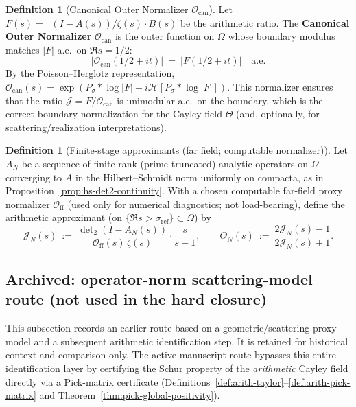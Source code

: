 \documentclass[11pt]{article}
\theoremstyle{definition}
\newtheorem{definition}[theorem]{Definition}
\theoremstyle{remark}
\theoremstyle{definition}
\DeclareMathOperator{\dettwo}{det_2}
\begin{document}
\begin{definition}[Canonical Outer Normalizer \(\mathcal O_{\mathrm{can}}\)]\label{def:canonical-normalizer}
Let $F(s) = \dettwo(I - A(s)) / \zeta(s) \cdot B(s)$ be the arithmetic ratio.
The \textbf{Canonical Outer Normalizer} \(\mathcal O_{\mathrm{can}}\) is the outer function on $\Omega$ whose boundary modulus matches $|F|$ a.e.\ on $\Re s = 1/2$:
\begin{equation}
  |\mathcal O_{\mathrm{can}}(1/2 + it)| \ = \ |F(1/2 + it)| \quad \text{a.e.}
\end{equation}
By the Poisson--Herglotz representation, \(\mathcal O_{\mathrm{can}}(s) = \exp(P_\sigma * \log |F| + i \mathcal H[P_\sigma * \log |F|])\). This normalizer ensures that the ratio $\mathcal J = F / \mathcal O_{\mathrm{can}}$ is unimodular a.e.\ on the boundary, which is the correct boundary normalization for the Cayley field $\Theta$ (and, optionally, for scattering/realization interpretations).
\end{definition}

\begin{definition}[Finite-stage approximants (far field; computable normalizer)]\label{def:finite-stage-approximants}
Let $A_N$ be a sequence of finite-rank (prime-truncated) analytic operators on $\Omega$ converging to $A$ in the Hilbert--Schmidt norm uniformly on compacta, as in Proposition~\ref{prop:hs-det2-continuity}.
With a chosen computable far-field proxy normalizer \(\mathcal O_{\mathrm{ff}}\) (used only for numerical diagnostics; not load-bearing), define the arithmetic approximant (on \(\{\Re s>\sigma_{\mathrm{ref}}\}\subset\Omega\)) by
\[
  \mathcal J_N(s)\ :=\ \frac{\det\nolimits_2(I-A_N(s))}{\mathcal O_{\mathrm{ff}}(s)\,\zeta(s)}\cdot \frac{s}{s-1},
  \qquad
  \Theta_N(s)\ :=\ \frac{2\mathcal J_N(s)-1}{2\mathcal J_N(s)+1}.
\]
\end{definition}

\subsection*{Archived: operator-norm scattering-model route (not used in the hard closure)}
This subsection records an earlier route based on a geometric/scattering proxy model and a subsequent arithmetic identification step. It is retained for historical context and comparison only.
The active manuscript route bypasses this entire identification layer by certifying the Schur property of the \emph{arithmetic} Cayley field directly via a Pick-matrix certificate (Definitions~\ref{def:arith-taylor}--\ref{def:arith-pick-matrix} and Theorem~\ref{thm:pick-global-positivity}).
\end{document}

